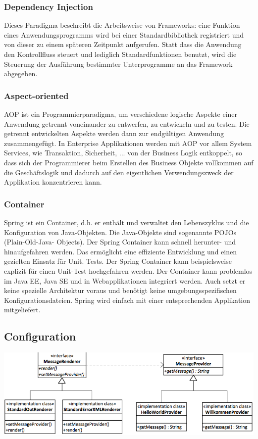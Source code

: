 \documentclass[10pt]{scrartcl}
\begin{document}
\subsubsection{Dependency Injection}
Dieses Paradigma beschreibt die Arbeitsweise von Frameworks: eine Funktion eines Anwendungsprogramms wird bei einer Standardbibliothek registriert und von dieser zu einem späteren Zeitpunkt aufgerufen. Statt dass die Anwendung den Kontrollfluss steuert und lediglich Standardfunktionen benutzt, wird die Steuerung der Ausführung bestimmter Unterprogramme an das Framework abgegeben.
\subsubsection{Aspect-oriented}
AOP ist ein Programmierparadigma, um verschiedene logische Aspekte einer Anwendung getrennt voneinander zu entwerfen, zu entwickeln und zu testen. Die getrennt entwickelten Aspekte werden dann zur endgültigen Anwendung zusammengefügt. In Enterprise Applikationen werden mit AOP vor allem System Services, wie Transaktion, Sicherheit, ... von der Business Logik entkoppelt, so dass sich der Programmierer beim Erstellen des Business Objekte vollkommen auf die Geschäftslogik und dadurch auf den eigentlichen Verwendungszweck der Applikation konzentrieren kann.
\subsubsection{Container}
Spring ist ein Container, d.h. er enthält und verwaltet den Lebenszyklus und die Konfiguration von Java-Objekten. Die Java-Objekte sind sogenannte POJOs (Plain-Old-Java- Objects). Der Spring Container kann schnell herunter- und hinaufgefahren werden. Das ermöglicht eine effiziente Entwicklung und einen gezielten Einsatz für Unit. Tests. Der Spring Container kann beispielsweise explizit für einen Unit-Test hochgefahren werden. Der Container kann problemlos im Java EE, Java SE und in Webapplikationen integriert werden. Auch setzt er keine spezielle Architektur voraus und benötigt keine umgebungsspezifischen Konfigurationsdateien. Spring wird einfach mit einer entsprechenden Applikation mitgeliefert.
\subsection{Configuration}
\begin{center}
	\includegraphics[scale=0.4]{simpleSpringApp.png}
\end{center}
\end{document}
